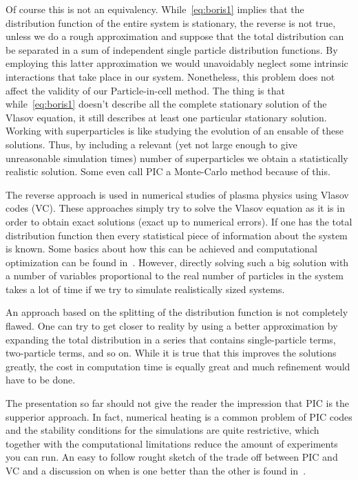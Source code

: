 \documentclass[12pt, class=report, crop=false]{standalone}
\begin{document}
Of course this is not an equivalency. While~\cref{eq:boris1} implies that the distribution function of the entire system is stationary, the reverse is not true, unless we do a rough approximation and suppose that the total distribution can be separated in a sum of independent single particle distribution functions. By employing this latter approximation we would unavoidably neglect some intrinsic interactions that take place in our system. Nonetheless, this problem does not affect the validity of our Particle-in-cell method. The thing is that while~\cref{eq:boris1} doesn't describe all the complete stationary solution of the Vlasov equation, it still describes at least one particular stationary solution. Working with superparticles is like studying the evolution of an ensable of these solutions. Thus, by including a relevant (yet not large enough to give unreasonable simulation times) number of superparticles we obtain a statistically realistic solution. Some even call PIC a Monte-Carlo method because of this.

The reverse approach is used in numerical studies of plasma physics using Vlasov codes (VC). These approaches simply try to solve the Vlasov equation as it is in order to obtain exact solutions (exact up to numerical errors). If one has the total distribution function then every statistical piece of information about the system is known. Some basics about how this can be achieved and computational optimization can be found in~\cite{silinVlasovcodeSimulationsCollisionless}. However, directly solving such a big solution with a number of variables proportional to the real number of particles in the system takes a lot of time if we try to simulate realistically sized systems.

An approach based on the splitting of the distribution function is not completely flawed. One can try to get closer to reality by using a better approximation by expanding the total distribution in a series that contains single-particle terms, two-particle terms, and so on. While it is true that this improves the solutions greatly, the cost in computation time is equally great and much refinement would have to be done.

The presentation so far should not give the reader the impression that PIC is the supperior approach. In fact, numerical heating is a common problem of PIC codes and the stability conditions for the simulations are quite restrictive, which together with the computational limitations reduce the amount of experiments you can run. An easy to follow rought sketch of the trade off between PIC and VC and a discussion on when is one better than the other is found in~\cite{bertrandVlasovModelsLaser2005}.
\end{document}
